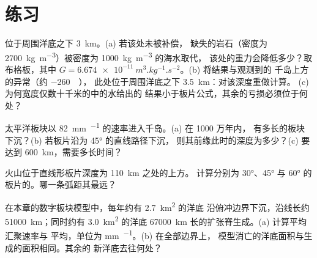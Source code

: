 \section{练习}

\begin{exercise}[$\star$]\label{exo:b1:active-margins:1}
位于周围洋底之下 \qty{3}{km}。(a) 若该处未被补偿，
缺失的岩石（密度为
\qty{2700}{kg.m^{-3}}）被密度为 \qty{1000}{kg.m^{-3}} 的海水取代，
该处的重力会降低多少？取布格板，其中
$G = \qty{6.674e-11}{m^3.kg^{-1}.s^{-2}}$。(b) 将结果与观测到的
千岛上方的异常（约 \qty{-260}{\milli\gal}），
此处位于周围洋底之下 \qty{3.5}{km}：对该深度重做计算。
(c) 为何宽度仅数十千米的中的水给出的
结果小于板片公式，其余的亏损必须位于何处？
\end{exercise}

\begin{exercise}[$\star$]\label{exo:b1:active-margins:2}
太平洋板块以 \qty{82}{mm.^{-1}} 的速率进入千岛。(a) 在 1000 万年内，
有多长的板块下沉？(b) 若板片沿为 \ang{45} 的直线路径下沉，
则其前缘此时的深度为多少？(c)
要达到 \qty{600}{km}，需要多长时间？
\end{exercise}

\begin{exercise}[$\star$]\label{exo:b1:active-margins:3}
火山位于直线形板片深度为 \qty{110}{km} 之处的上方。
计算分别为 \ang{30}、\ang{45} 与
\ang{60} 的板片的。哪一条弧距其最远？
\end{exercise}

\begin{exercise}[$\star$]\label{exo:b1:active-margins:4}
在本章的数字板块模型中，每年约有 \qty{2.7}{km^2} 的洋底
沿俯冲边界下沉，沿线长约
\qty{51000}{km}；同时约有 \qty{3.0}{km^2} 的洋底
\qty{67000}{km} 长的扩张脊生成。(a) 计算平均汇聚速率与
平均，单位为 \unit{mm.^{-1}}。(b) 在全部边界上，
模型消亡的洋底面积与生成的面积相同。其余的
新洋底去往何处？
\end{exercise}

